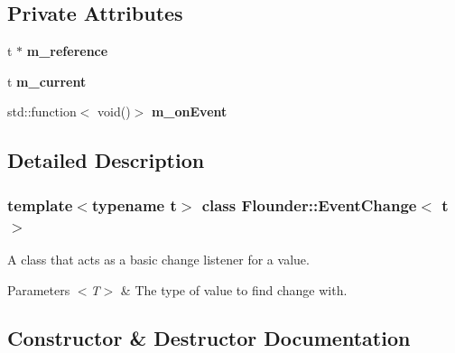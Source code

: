 \subsection*{Private Attributes}
\begin{DoxyCompactItemize}
\item 
\mbox{\label{class_flounder_1_1_event_change_afa83df4151afa873c490b1a83b7d84ae}} 
t $\ast$ {\bfseries m\+\_\+reference}
\item 
\mbox{\label{class_flounder_1_1_event_change_afdc67ead7e9ce4eef85a828a213900b1}} 
t {\bfseries m\+\_\+current}
\item 
\mbox{\label{class_flounder_1_1_event_change_ae863e1df0281ba1a4e50391ba376f2fd}} 
std\+::function$<$ void()$>$ {\bfseries m\+\_\+on\+Event}
\end{DoxyCompactItemize}


\subsection{Detailed Description}
\subsubsection*{template$<$typename t$>$\newline
class Flounder\+::\+Event\+Change$<$ t $>$}

A class that acts as a basic change listener for a value. 


\begin{DoxyParams}{Parameters}
{\em $<$\+T$>$} & The type of value to find change with. \\
\hline
\end{DoxyParams}


\subsection{Constructor \& Destructor Documentation}
\mbox{\label{class_flounder_1_1_event_change_adf5f452e97195baf2e4d4bfd3b5f6fd3}} 
